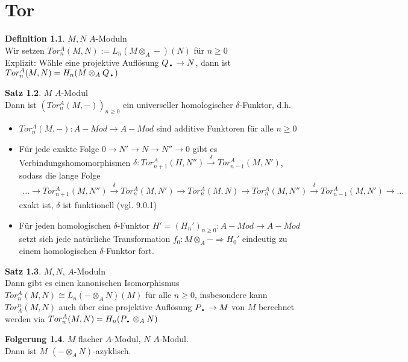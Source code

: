 \documentclass[10pt,a4paper,numbers=endperiod]{scrreprt}
\theoremstyle{definition}
\newtheorem{satz}{Satz}[section]
\newtheorem{defi}[satz]{Definition}
\newtheorem{folg}[satz]{Folgerung}
\newcommand{\point}{\text{\textbullet}}
\begin{document}
\chapter{Tor}

\begin{defi}
	$M, N$ $A$-Moduln\\
	Wir setzen $Tor_n^A(M,N) := L_n(M \otimes_A -) (N)$ für $n \geq 0$\\
	Explizit: Wähle eine projektive Auflösung  $Q_\point \to N$, dann ist $Tor_n^A(M, N) = H_n (M \otimes_A Q_\point)$
\end{defi}

\begin{satz}
	$M$ $A$-Modul\\
	Dann ist $(Tor_n^A(M, -))_{n \geq 0}$ ein universeller homologischer $\delta$-Funktor, d.h. \begin{itemize}
		\item $Tor_n^A(M, -): A-Mod \to A-Mod$ sind additive Funktoren für alle $n \geq 0$
		\item Für jede exakte Folge $0 \to N' \to N \to N'' \to 0$ gibt es Verbindungshomomorphismen $\delta: Tor_{n+1}^A(H, N'') \overset{\delta}{\to} Tor_{n-1}^A (M, N')$, sodass die lange Folge \begin{align*}
			\ldots \to Tor_{n+1}^A(M, N'') \overset{\delta}{\to} Tor_n^A(M, N') \to Tor_n^A(M, N) \to Tor_n^A(M, N'') \overset{\delta}{\to} Tor_{n-1}^A(M, N') \to \ldots
		\end{align*}
		exakt ist, $\delta$ ist funktionell (vgl. 9.0.1)
		\item Für jeden homologischen $\delta$-Funktor $H' = (H_n')_{n \geq 0}: A-Mod \to A-Mod$ setzt sich jede natürliche Transformation $f_0: M \otimes_A - \Rightarrow H_0'$ eindeutig zu einem homologischen $\delta$-Funktor fort.
	\end{itemize}
\end{satz}

\begin{satz}
	$M, N$, $A$-Moduln\\
	Dann gibt es einen kanonischen Isomorphismus $Tor_n^A(M, N) \cong L_n(-\otimes_A N)(M)$ für alle $n \geq 0$, insbesondere kann $Tor_A^n(M, N)$ auch über eine projektive Auflösung $P_\point \to M$ von $M$ berechnet werden via $Tor_n^A(M, N) = H_n(P_\point \otimes_A N)$
\end{satz}

\begin{folg}
	$M$ flacher $A$-Modul, $N$ $A$-Modul.\\
	Dann ist $M$ $(-\otimes_AN)$-azyklisch.
\end{folg}
\end{document}
